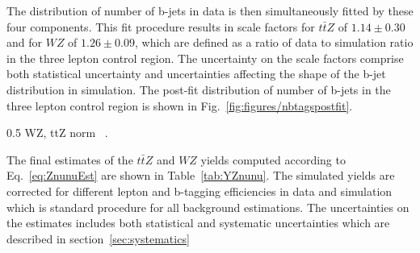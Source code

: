 The distribution of number of b-jets in data is then simultaneously fitted by these four components. This fit procedure results in scale factors for $t\bar{t}Z$ of $1.14 \pm 0.30$ and for $WZ$ of $1.26 \pm 0.09$, which are defined as a ratio of data to simulation ratio in the three lepton control region. The uncertainty on the scale factors comprise both statistical uncertainty and uncertainties affecting the shape of the b-jet distribution in simulation. The post-fit distribution of number of b-jets in the three lepton control region is shown in Fig.~\ref{fig:figures/nbtagspostfit}.

                 {0.5}       %
                 { WZ, ttZ norm ~\cite{Sirunyan:2017uyt}. }


The final estimates of the $t\bar{t}Z$ and $WZ$ yields computed according to Eq.~\ref{eq:ZnunuEst} are shown in Table~\ref{tab:YZnunu}. The simulated yields are corrected for different lepton and b-tagging efficiencies in data and simulation which is standard procedure for all background estimations.  The uncertainties on the estimates includes both statistical and systematic uncertainties which are described in section~\ref{sec:systematics}


